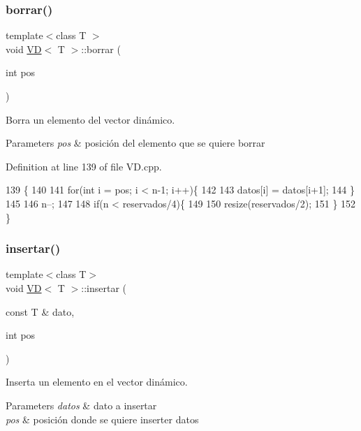 \subsubsection{\texorpdfstring{borrar()}{borrar()}}
{\footnotesize\ttfamily template$<$class T $>$ \\
void \hyperlink{classVD}{VD}$<$ T $>$\+::borrar (\begin{DoxyParamCaption}\item[{int}]{pos }\end{DoxyParamCaption})}



Borra un elemento del vector dinámico. 


\begin{DoxyParams}{Parameters}
{\em pos} & posición del elemento que se quiere borrar \\
\hline
\end{DoxyParams}


Definition at line 139 of file V\+D.\+cpp.


\begin{DoxyCode}
139                          \{
140 
141     \textcolor{keywordflow}{for}(\textcolor{keywordtype}{int} i = pos; i < n-1; i++)\{
142 
143         datos[i] = datos[i+1];
144     \}
145 
146     n--;
147 
148     \textcolor{keywordflow}{if}(n < reservados/4)\{
149 
150         resize(reservados/2);
151     \}
152 \}
\end{DoxyCode}
\mbox{\label{classVD_a10bba26b426aa83456437543d794b429}} 
\subsubsection{\texorpdfstring{insertar()}{insertar()}}
{\footnotesize\ttfamily template$<$class T$>$ \\
void \hyperlink{classVD}{VD}$<$ T $>$\+::insertar (\begin{DoxyParamCaption}\item[{const T \&}]{dato,  }\item[{int}]{pos }\end{DoxyParamCaption})}



Inserta un elemento en el vector dinámico. 


\begin{DoxyParams}{Parameters}
{\em datos} & dato a insertar \\
\hline
{\em pos} & posición donde se quiere inserter datos \\
\hline
\end{DoxyParams}


